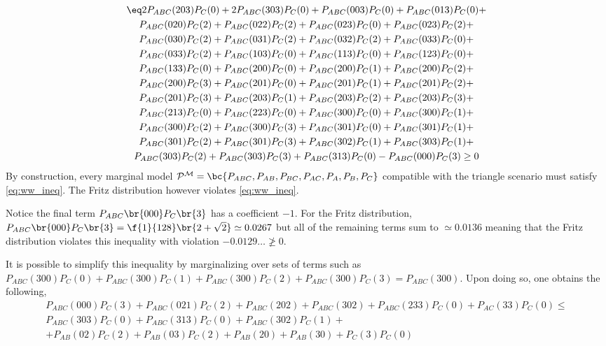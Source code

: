 \documentclass[aps, 10pt, english, twoside, pra, nofootinbib, tightenlines, longbibliography]{revtex4-1}
\begin{document}
    \begin{equation*}
    \begin{gathered}
    \eq\label{eq:ww_ineq}
    2P_{ABC}(203)P_{C}(0) + 2P_{ABC}(303)P_{C}(0) + P_{ABC}(003)P_{C}(0) + P_{ABC}(013)P_{C}(0) + \\
    P_{ABC}(020)P_{C}(2) + P_{ABC}(022)P_{C}(2) + P_{ABC}(023)P_{C}(0) + P_{ABC}(023)P_{C}(2) + \\
    P_{ABC}(030)P_{C}(2) + P_{ABC}(031)P_{C}(2) + P_{ABC}(032)P_{C}(2) + P_{ABC}(033)P_{C}(0) + \\
    P_{ABC}(033)P_{C}(2) + P_{ABC}(103)P_{C}(0) + P_{ABC}(113)P_{C}(0) + P_{ABC}(123)P_{C}(0) + \\
    P_{ABC}(133)P_{C}(0) + P_{ABC}(200)P_{C}(0) + P_{ABC}(200)P_{C}(1) + P_{ABC}(200)P_{C}(2) + \\
    P_{ABC}(200)P_{C}(3) + P_{ABC}(201)P_{C}(0) + P_{ABC}(201)P_{C}(1) + P_{ABC}(201)P_{C}(2) + \\
    P_{ABC}(201)P_{C}(3) + P_{ABC}(203)P_{C}(1) + P_{ABC}(203)P_{C}(2) + P_{ABC}(203)P_{C}(3) + \\
    P_{ABC}(213)P_{C}(0) + P_{ABC}(223)P_{C}(0) + P_{ABC}(300)P_{C}(0) + P_{ABC}(300)P_{C}(1) + \\
    P_{ABC}(300)P_{C}(2) + P_{ABC}(300)P_{C}(3) + P_{ABC}(301)P_{C}(0) + P_{ABC}(301)P_{C}(1) + \\
    P_{ABC}(301)P_{C}(2) + P_{ABC}(301)P_{C}(3) + P_{ABC}(302)P_{C}(1) + P_{ABC}(303)P_{C}(1) + \\
    P_{ABC}(303)P_{C}(2) + P_{ABC}(303)P_{C}(3) + P_{ABC}(313)P_{C}(0) - P_{ABC}(000)P_{C}(3) \geq 0
    \end{gathered}
    \end{equation*}
    By construction, every marginal model $\probvec^{\mscenario} = \bc{\prob[ABC], \prob[AB], \prob[BC], \prob[AC], \prob[A], \prob[B], \prob[C]}$ compatible with the triangle scenario must satisfy \cref{eq:ww_ineq}. The Fritz distribution however violates \cref{eq:ww_ineq}.

    Notice the final term $\prob[ABC]\br{000}\prob[C]\br{3}$ has a coefficient $-1$. For the Fritz distribution, $\prob[ABC]\br{000}\prob[C]\br{3} = \f{1}{128}\br{2 + \sqrt{2}} \simeq 0.0267$ but all of the remaining terms sum to $\simeq 0.0136$ meaning that the Fritz distribution violates this inequality with violation $-0.0129\ldots \not \geq 0$.


    It is possible to simplify this inequality by marginalizing over sets of terms such as $P_{ABC}(300)P_{C}(0) + P_{ABC}(300)P_{C}(1) + P_{ABC}(300)P_{C}(2) + P_{ABC}(300)P_{C}(3) = P_{ABC}(300)$. Upon doing so, one obtains the following,
    \begin{gather*}
        P_{ABC}(000)P_{C}(3) + P_{ABC}(021)P_{C}(2) + P_{ABC}(202) + P_{ABC}(302) + P_{ABC}(233)P_{C}(0) + P_{AC}(33)P_{C}(0) \leq \\ P_{ABC}(303)P_{C}(0) + P_{ABC}(313)P_{C}(0) + P_{ABC}(302)P_{C}(1) + \\
        + P_{AB}(02)P_{C}(2) + P_{AB}(03)P_{C}(2) + P_{AB}(20) + P_{AB}(30) + P_{C}(3)P_{C}(0)
    \end{gather*}
\end{document}

